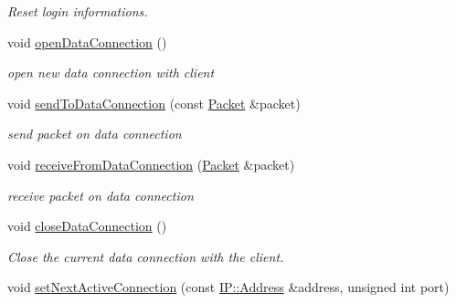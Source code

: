 \begin{DoxyCompactItemize}
\begin{DoxyCompactList}\small\item\em Reset login informations. \end{DoxyCompactList}\item 
\hypertarget{classFTP_1_1Client_a027ed05405359ceb55ed5c6a7205ac41}{}void \hyperlink{classFTP_1_1Client_a027ed05405359ceb55ed5c6a7205ac41}{open\+Data\+Connection} ()\label{classFTP_1_1Client_a027ed05405359ceb55ed5c6a7205ac41}

\begin{DoxyCompactList}\small\item\em open new data connection with client \end{DoxyCompactList}\item 
\hypertarget{classFTP_1_1Client_af278600020f84005d320054c55f2d260}{}void \hyperlink{classFTP_1_1Client_af278600020f84005d320054c55f2d260}{send\+To\+Data\+Connection} (const \hyperlink{classFTP_1_1Packet}{Packet} \&packet)\label{classFTP_1_1Client_af278600020f84005d320054c55f2d260}

\begin{DoxyCompactList}\small\item\em send packet on data connection \end{DoxyCompactList}\item 
\hypertarget{classFTP_1_1Client_a8fccfc0518176fb246308f2fb6bc3d62}{}void \hyperlink{classFTP_1_1Client_a8fccfc0518176fb246308f2fb6bc3d62}{receive\+From\+Data\+Connection} (\hyperlink{classFTP_1_1Packet}{Packet} \&packet)\label{classFTP_1_1Client_a8fccfc0518176fb246308f2fb6bc3d62}

\begin{DoxyCompactList}\small\item\em receive packet on data connection \end{DoxyCompactList}\item 
\hypertarget{classFTP_1_1Client_ad8c92ae82b9371bc6da087c77ef0d9d9}{}void \hyperlink{classFTP_1_1Client_ad8c92ae82b9371bc6da087c77ef0d9d9}{close\+Data\+Connection} ()\label{classFTP_1_1Client_ad8c92ae82b9371bc6da087c77ef0d9d9}

\begin{DoxyCompactList}\small\item\em Close the current data connection with the client. \end{DoxyCompactList}\item 
\hypertarget{classFTP_1_1Client_a140d72957c3ee4ed2ecc91bd21ce0c66}{}void \hyperlink{classFTP_1_1Client_a140d72957c3ee4ed2ecc91bd21ce0c66}{set\+Next\+Active\+Connection} (const \hyperlink{classFTP_1_1IP_1_1Address}{I\+P\+::\+Address} \&address, unsigned int port)\label{classFTP_1_1Client_a140d72957c3ee4ed2ecc91bd21ce0c66}


\end{DoxyCompactItemize}
